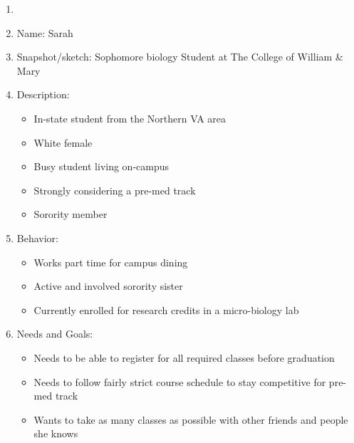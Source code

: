 \documentclass[11pt]{article}
\begin{document}
\begin{enumerate}[1.]
\begin{enumerate}[1.]
\item {}

\item Name: Sarah
\item Snapshot/sketch: Sophomore biology Student at The College of William \& Mary
\item Description: 
\begin{itemize}
\item In-state student from the Northern VA area
\item White female
\item Busy student living on-campus
\item Strongly considering a pre-med track
\item Sorority member
\end{itemize}
\item Behavior: 
\begin{itemize}
\item Works part time for campus dining
\item Active and involved sorority sister
\item Currently enrolled for research credits in a micro-biology lab
\end{itemize}
\item Needs and Goals:
\begin{itemize}
\item Needs to be able to register for all required classes before graduation
\item Needs to follow fairly strict course schedule to stay competitive for pre-med track
\item Wants to take as many classes as possible with other friends and people she knows
\end{itemize}
\end{enumerate}


\end{enumerate}
\end{document}
